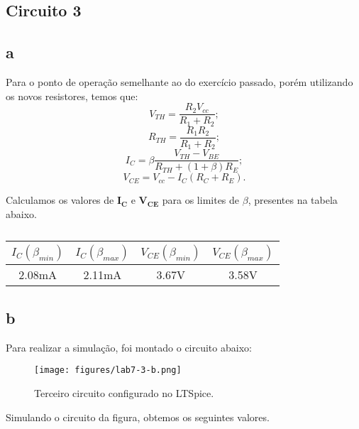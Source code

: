 \documentclass[a4paper]{report}
\begin{document}
\subsection*{Circuito 3}
\subsection*{a}
Para o ponto de operação semelhante ao do exercício passado, porém utilizando os novos resistores, temos que:
    \begin{equation}
        V_{TH} = \frac{R_2 V_{cc}}{R_1+R_2};
    \end{equation}
    \begin{equation}
        R_{TH} = \frac{R_1 R_2}{R_1+R_2};
    \end{equation}
    \begin{equation}
        I_C =\beta \frac{V_{TH}- V_{BE}}{R_{TH} + (1+\beta)R_E};
    \end{equation}
    \begin{equation}
        V_{CE} = V_{cc} - I_C(R_C + R_E).
    \end{equation}

Calculamos os valores de $\mathbf{I_C} $ e $\mathbf{V_{CE}}$ para os limites de $\beta$, presentes na tabela abaixo.

\begin{table}[!h]
    \centering
    \begin{tabular}{|c|c|c|c|}
    \hline
    $I_C(\beta_{min})$	&	$I_C(\beta_{max})$	&	$V_{CE}(\beta_{min})$	&	$V_{CE}(\beta_{max})$	\\	\hline
2.08mA	&	2.11mA	&	3.67V	&	3.58V	\\	\hline
    \end{tabular}
    \caption{}
    \label{tab:Q3a}
\end{table}

\subsection*{b}


Para realizar a simulação, foi montado o circuito abaixo:

\begin{figure}[H]
    \centering
    \texttt{[image: figures/lab7-3-b.png]}
    \caption{Terceiro circuito configurado no LTSpice.}
    \label{fig:figures-lab7-1-c-png}
\end{figure}


Simulando o circuito da figura, obtemos os seguintes valores.
\end{document}
